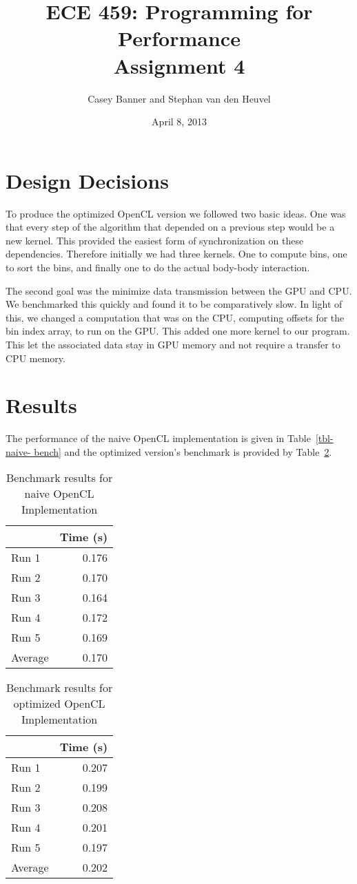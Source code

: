 \documentclass[12pt]{article}
\title{ECE 459: Programming for Performance\\Assignment 4}
\author{Casey Banner and Stephan van den Heuvel}
\date{April 8, 2013}
\begin{document}
\maketitle

\section{Design Decisions}
To produce the optimized OpenCL version we followed two basic ideas. One was that every 
step of the algorithm
that depended on a previous step would be a new kernel. This provided the easiest form of 
synchronization on
these dependencies. Therefore initially we had three kernels. One to compute bins, one to 
sort the bins, and 
finally one to do the actual body-body interaction.

The second goal was the minimize data transmission between the GPU and CPU. We 
benchmarked this quickly and
found it to be comparatively slow. In light of this, we changed a computation that was on 
the CPU, computing
offsets for the bin index array, to run on the GPU. This added one more kernel to our 
program. This let the associated data stay in GPU memory and not require a transfer to 
CPU memory.

\section{Results}

The performance of the naive OpenCL implementation is given in Table~\ref{tbl-naive-
bench} and the optimized 
version's benchmark is provided by Table~\ref{tbl-opt-bench}.

\begin{table}[H]
  \centering
  \begin{tabular}{lr}
    & {\bf Time (s)} \\
    \hline
    Run 1 & 0.176 \\
    Run 2 & 0.170 \\
    Run 3 & 0.164 \\
    Run 4 & 0.172 \\
    Run 5 & 0.169 \\
    \hline
    Average & 0.170 \\
  \end{tabular}
  \caption{Benchmark results for naive OpenCL Implementation}
  \label{tbl-naive-bench}
\end{table}

\begin{table}[H]
  \centering
  \begin{tabular}{lr}
    & {\bf Time (s)} \\
    \hline
    Run 1 & 0.207 \\
    Run 2 & 0.199 \\
    Run 3 & 0.208 \\
    Run 4 & 0.201 \\
    Run 5 & 0.197 \\
    \hline
    Average & 0.202 \\
  \end{tabular}
  \caption{Benchmark results for optimized OpenCL Implementation}
  \label{tbl-opt-bench}
\end{table}
\end{document}
